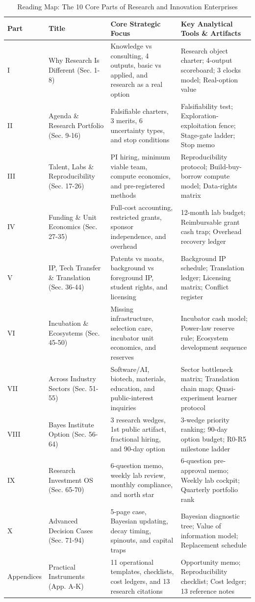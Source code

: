 \begin{table}[t]
\centering
\small
\caption{Reading Map: The 10 Core Parts of Research and Innovation Enterprises}
\label{tab:ch33_reading_map}
\begin{tabularx}{\textwidth}{p{1.8cm} p{3.2cm} p{4.2cm} X}
\toprule
\textbf{Part} & \textbf{Title} & \textbf{Core Strategic Focus} & \textbf{Key Analytical Tools \& Artifacts} \\
\midrule
I & Why Research Is Different (Sec. 1-8) & Knowledge vs consulting, 4 outputs, basic vs applied, and research as a real option & Research object charter; 4-output scoreboard; 3 clocks model; Real-option value \\
II & Agenda \& Research Portfolio (Sec. 9-16) & Falsifiable charters, 3 merits, 6 uncertainty types, and stop conditions & Falsifiability test; Exploration-exploitation fence; Stage-gate ladder; Stop memo \\
III & Talent, Labs \& Reproducibility (Sec. 17-26) & PI hiring, minimum viable team, compute economics, and pre-registered methods & Reproducibility protocol; Build-buy-borrow compute model; Data-rights matrix \\
IV & Funding \& Unit Economics (Sec. 27-35) & Full-cost accounting, restricted grants, sponsor independence, and overhead & 12-month lab budget; Reimbursable grant cash trap; Overhead recovery ledger \\
V & IP, Tech Transfer \& Translation (Sec. 36-44) & Patents vs moats, background vs foreground IP, student rights, and licensing & Background IP schedule; Translation ledger; Licensing matrix; Conflict register \\
VI & Incubation \& Ecosystems (Sec. 45-50) & Missing infrastructure, selection care, incubator unit economics, and reserves & Incubator cash model; Power-law reserve rule; Ecosystem development sequence \\
VII & Across Industry Sectors (Sec. 51-55) & Software/AI, biotech, materials, education, and public-interest inquiries & Sector bottleneck matrix; Translation chain map; Quasi-experiment learner protocol \\
VIII & Bayes Institute Option (Sec. 56-64) & 3 research wedges, 1st public artifact, fractional hiring, and 90-day option & 3-wedge priority ranking; 90-day option budget; R0-R5 milestone ladder \\
IX & Research Investment OS (Sec. 65-70) & 6-question memo, weekly lab review, monthly compliance, and north star & 6-question pre-approval memo; Weekly lab cockpit; Quarterly portfolio rank \\
X & Advanced Decision Cases (Sec. 71-94) & 5-page case, Bayesian updating, decay timing, spinouts, and capital traps & Bayesian diagnostic tree; Value of information model; Replacement schedule \\
Appendices & Practical Instruments (App. A-K) & 11 operational templates, checklists, cost ledgers, and 13 research citations & Opportunity memo; Reproducibility checklist; Cost ledger; 13 reference notes \\
\bottomrule
\end{tabularx}
\end{table}

